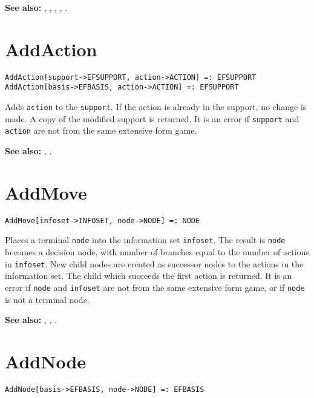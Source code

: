 \textbf{See also:}
,
,
,
,
.


\section*{AddAction}\label{PrimAddAction}
\begin{verbatim}
AddAction[support->EFSUPPORT, action->ACTION] =: EFSUPPORT 
AddAction[basis->EFBASIS, action->ACTION] =: EFSUPPORT 
\end{verbatim}

Adds \verb+action+ to the \verb+support+.  If the action is already in
the support, no change is made.  A copy of the modified support is
returned.  It is an error if \verb+support+ and \verb+action+ are not from the
same extensive form game.

\textbf{See also:}
,
.


\section*{AddMove}\label{PrimAddMove}
\begin{verbatim}
AddMove[infoset->INFOSET, node->NODE] =: NODE 
\end{verbatim}

Places a terminal \verb+node+ into the information set
\verb+infoset+.  The result is \verb+node+ becomes a decision node,
with number of branches equal to the number of actions in \verb+infoset+.
New child nodes are created as successor nodes to the actions in the
information set.  The child which succeeds the first action is returned.
It is an error if \verb+node+ and \verb+infoset+ are not from the same
extensive form game, or if \verb+node+ is not a terminal node.

\textbf{See also:} ,
,
.


\section*{AddNode}\label{PrimAddNode}
\begin{verbatim}
AddNode[basis->EFBASIS, node->NODE] =: EFBASIS
\end{verbatim}

